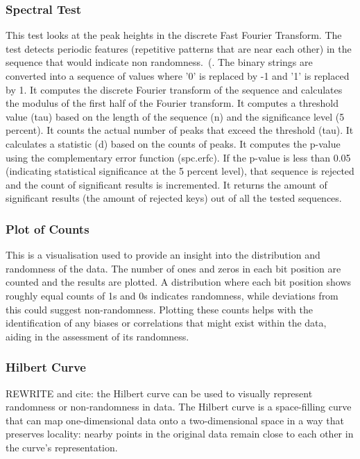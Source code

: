 \subsubsection{Spectral Test}
This test looks at the peak heights in the discrete Fast Fourier Transform. The test detects periodic features (repetitive patterns that are near each other) in the sequence that would indicate non randomness.~(\cite{1195701}. The binary strings are converted into a sequence of values where '0' is replaced by -1 and '1' is replaced by 1. It computes the discrete Fourier transform of the sequence and calculates the modulus of the first half of the Fourier transform. It computes a threshold value (tau) based on the length of the sequence (n) and the significance level (5 percent). It counts the actual number of peaks that exceed the threshold (tau). It calculates a statistic (d) based on the counts of peaks. It computes the p-value using the complementary error function (spc.erfc). If the p-value is less than 0.05 (indicating statistical significance at the 5 percent level), that sequence is rejected and the count of significant results is incremented. It returns the amount of significant results (the amount of rejected keys) out of all the tested sequences. 

\subsubsection{Plot of Counts}
This is a visualisation used to provide an insight into the distribution and randomness of the data. The number of ones and zeros in each bit position are counted and the results are plotted. A distribution where each bit position shows roughly equal counts of 1s and 0s indicates randomness, while deviations from this could suggest non-randomness. Plotting these counts helps with the identification of any biases or correlations that might exist within the data, aiding in the assessment of its randomness. 


\subsubsection{Hilbert Curve}
REWRITE and cite: the Hilbert curve can be used to visually represent randomness or non-randomness in data. The Hilbert curve is a space-filling curve that can map one-dimensional data onto a two-dimensional space in a way that preserves locality: nearby points in the original data remain close to each other in the curve's representation.

